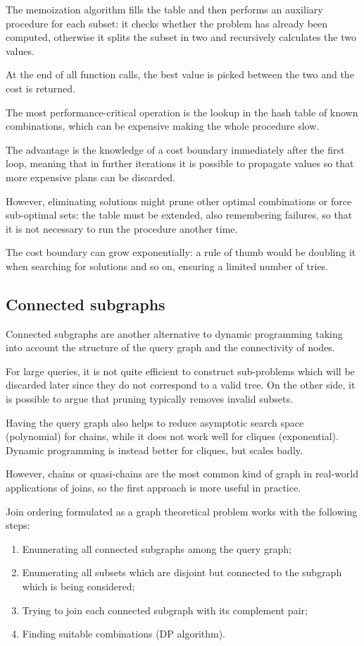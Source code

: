 The memoization algorithm fills the table and then performs an auxiliary procedure for each subset: it checks whether the problem has already been computed, otherwise it splits the subset in two and recursively calculates the two values.

At the end of all function calls, the best value is picked between the two and the cost is returned. 

The most performance-critical operation is the lookup in the hash table of known combinations, which can be expensive making the whole procedure slow.

The advantage is the knowledge of a cost boundary immediately after the first loop, meaning that in further iterations it is possible to propagate values so that more expensive plans can be discarded.

However, eliminating solutions might prune other optimal combinations or force sub-optimal sets: the table must be extended, also remembering failures, so that it is not necessary to run the procedure another time.

The cost boundary can grow exponentially: a rule of thumb would be doubling it when searching for solutions and so on, ensuring a limited number of tries. 

\subsection{Connected subgraphs}
Connected subgraphs are another alternative to dynamic programming taking into account the structure of the query graph and the connectivity of nodes.

For large queries, it is not quite efficient to construct sub-problems which will be discarded later since they do not correspond to a valid tree. On the other side, it is possible to argue that pruning typically removes invalid subsets.

Having the query graph also helps to reduce asymptotic search space (polynomial) for chains, while it does not work well for cliques (exponential). Dynamic programming is instead better for cliques, but scales badly.

However, chains or quasi-chains are the most common kind of graph in real-world applications of joins, so the first approach is more useful in practice.

Join ordering formulated as a graph theoretical problem works with the following steps:

\begin{enumerate}
	\item Enumerating all connected subgraphs among the query graph;
	\item Enumerating all subsets which are disjoint but connected to the subgraph which is being considered;
	\item Trying to join each connected subgraph with its complement pair;
	\item Finding suitable combinations (DP algorithm).
\end{enumerate}

